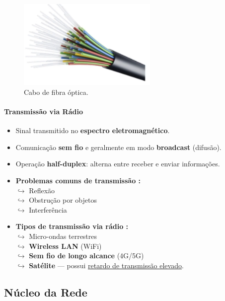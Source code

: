     \begin{figure}[H]
        \centering
        \includegraphics[width=0.6\textwidth]{img/cap-01/fibra-optica.png}
        \caption{Cabo de fibra óptica.}
    \end{figure}

    \paragraph{Transmissão via Rádio}
    \begin{itemize}
        \item Sinal transmitido no \textbf{espectro eletromagnético}.
        \item Comunicação \textbf{sem fio} e geralmente em modo \textbf{broadcast} (difusão).
        \item Operação \textbf{half-duplex}: alterna entre receber e enviar informações.
        \item \textbf{Problemas comuns de transmissão :} \\
            $\hookrightarrow$ Reflexão \\
            $\hookrightarrow$ Obstrução por objetos \\
            $\hookrightarrow$ Interferência 
        \item \textbf{Tipos de transmissão via rádio :} \\
            $\hookrightarrow$ Micro-ondas terrestres \\
            $\hookrightarrow$ \textbf{Wireless LAN} (WiFi) \\
            $\hookrightarrow$ \textbf{Sem fio de longo alcance} (4G/5G) \\
            $\hookrightarrow$ \textbf{Satélite} — possui \underline{retardo de transmissão elevado}.
    \end{itemize}

    \subsection{Núcleo da Rede}

